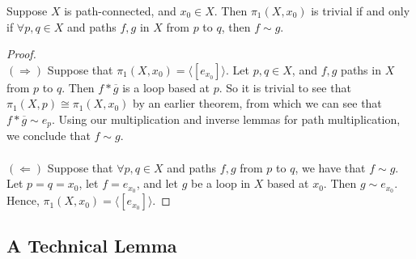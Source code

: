 \begin{lemma}
	Suppose $X$ is path-connected, and $x_0 \in X$. Then $\pi_1(X,x_0) $ is trivial if and only if $\forall p,q\in X$ and paths $f,g$ in $X$ from $p$ to $q$, then $f\sim g$. 
\end{lemma}
\begin{proof}
	\text{}\\
	$(\Rightarrow)$ Suppose that $\pi_1 (X,x_0) = \langle [e_{x_0} ] \rangle$. Let $p,q \in X$, and $f,g$ paths in $X$ from $p$ to $q$. Then $f\ast \overline{g}$ is a loop based at $p$. So it is trivial to see that $\pi_1 (X, p) \cong \pi_1 (X,x_0)$ by an earlier theorem, from which we can see that $f\ast \overline{g} \sim e_p$. Using our multiplication and inverse lemmas for path multiplication, we conclude that $f\sim g$. \\\\
	$(\Leftarrow)$ Suppose that $\forall p,q \in X$ and paths $f,g$ from $p$ to $q$, we have that $f\sim g$. Let $p=q=x_0$, let $f = e_{x_0}$, and let $g$ be a loop in $X$ based at $x_0$. Then $g\sim e_{x_0}$. Hence, $\pi_1(X,x_0) = \langle [e_{x_0}] \rangle$. 
\end{proof}

\subsection{A Technical Lemma}

